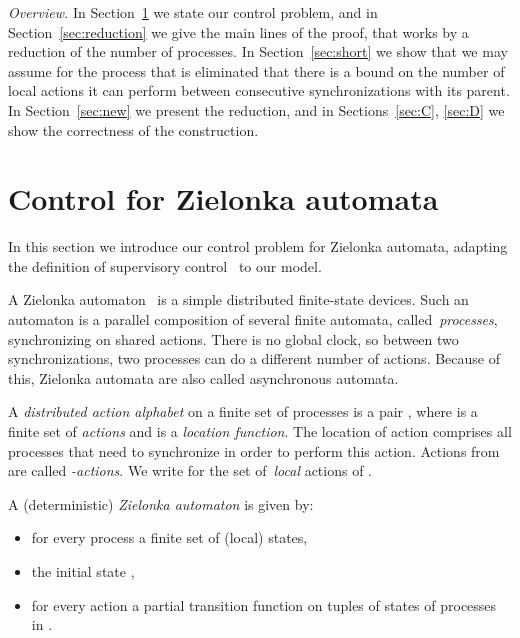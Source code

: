 \documentclass[10pt,a4paper]{article}
\begin{document}
\emph{Overview.} In Section~\ref{sec:defs} we state our control
problem, and in Section~\ref{sec:reduction} we give the main lines of
the proof, that works by a reduction of the number of processes. In
Section~\ref{sec:short} we show that we may assume for the process
that is eliminated that there is a bound on the number of local actions
it can perform between consecutive synchronizations with its
parent. In Section~\ref{sec:new} we present the reduction, and in
Sections~\ref{sec:C}, \ref{sec:D} we show the correctness of the
construction. 






\section{Control for Zielonka automata}\label{sec:defs}

In this section we introduce our control problem for Zielonka
automata, adapting  the definition of
supervisory control~\cite{RW89} to our model. 




A Zielonka automaton~\cite{zie87,ms97} is a simple
distributed finite-state devices. Such an automaton is a parallel
composition of several finite automata, called~\emph{processes},
synchronizing on shared actions. There is no global clock, so between
two synchronizations, two processes can do a different number of
actions. Because of this, Zielonka automata are also called
asynchronous automata.

A \emph{distributed action alphabet} on a finite set  of processes is a
pair , where  is a finite set of \emph{actions} and
 is a \emph{location
  function}. The location  of action  comprises all
processes  that need to synchronize in order to perform this
action. Actions from  are called \emph{-actions}. 
We write 
for the set of~\emph{local} actions of . 


A (deterministic) \emph{Zielonka automaton}
 is
given by:
\begin{itemize}
\item for every process  a finite set  of (local) states,
\item the initial state , 
\item for every action  a partial transition function
   on tuples of states of processes in .
\end{itemize}
\end{document}
